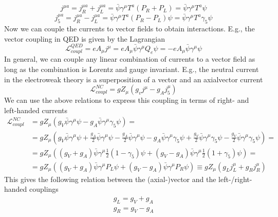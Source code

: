 \begin{equation*}
j^{\mu a} = j^{\mu a}_R + j^{\mu a}_L = \bar{\psi} \gamma^{\mu} T^a \left( P_R + P_L \right) = \bar{\psi} \gamma^{\mu} T^a \psi
\end{equation*}
\begin{equation*}
j^{\mu a}_5 = j^{\mu a}_R - j^{\mu a}_L = \bar{\psi} \gamma^{\mu} T^a \left( P_R - P_L \right) \psi = \bar{\psi} \gamma^{\mu} T^a \gamma_5 \psi
\end{equation*}
Now we can couple the currents to vector fields to obtain interactions. E.g., the vector coupling in QED is given by the Lagrangian
\begin{equation*}
\mathcal{L}_{coupl}^{QED} = e A_ {\mu} j^{\mu} = e A_{\mu} \bar{\psi} \gamma^{\mu} Q_e \psi = -e A_{\mu} \bar{\psi} \gamma^{\mu} \psi 
\end{equation*}
In general, we can couple any linear combination of currents to a vector field as long as the combination is Lorentz and gauge invariant. E.g., the neutral current in the electroweak theory is a superposition of a vector and an axialvector current
\begin{equation*}
\mathcal{L}_{coupl}^{NC} = g Z_{\mu} \left( g_v j^{\mu} - g_A j^{\mu}_5 \right)
\end{equation*}
We can use the above relations to express this coupling in terms of right- and left-handed currents
\begin{align*}
\mathcal{L}_{coupl}^{NC} & = g Z_{\mu} \left( g_V \bar{\psi} \gamma^{\mu} \psi - g_A \bar{\psi} \gamma^{\mu} \gamma_5 \psi \right) = & \\
& = g Z_{\mu} \left( g_V \bar{\psi} \gamma^{\mu} \psi + \frac{g_A}{2} \bar{\psi} \gamma^{\mu} \psi - \frac{g_A}{2} \bar{\psi} \gamma^{\mu} \psi - g_A \bar{\psi} \gamma^{\mu} \gamma_5 \psi + \frac{g_V}{2} \bar{\psi} \gamma^{\mu} \gamma_5 \psi - \frac{g_V}{2} \bar{\psi} \gamma^{\mu} \gamma_5 \psi \right) = & \\
& = g Z_{\mu} \left( \left( g_V + g_A \right) \bar{\psi} \gamma^{\mu} \frac{1}{2} \left( 1 - \gamma_5 \right) \psi + \left( g_V - g_A \right) \bar{\psi} \gamma^{\mu} \frac{1}{2} \left( 1 + \gamma_5 \right) \psi \right) = & \\
& = g Z_{\mu} \left( \left( g_V + g_A \right) \bar{\psi} \gamma^{\mu} P_L \psi + \left( g_V - g_A \right) \bar{\psi} \gamma^{\mu} P_R \psi \right) \equiv g Z_{\mu} \left( g_L j^{\mu}_L + g_R j^{\mu}_R \right)  &
\end{align*}
This gives the following relation between the (axial-)vector and the left-/right-handed couplings
\begin{align*}
&g_L = g_V + g_A &\\
&g_R = g_V - g_A &
\end{align*}

